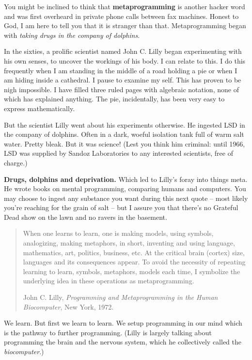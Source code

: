 \documentclass[10pt,twoside]{report}
\begin{document}
You might be inclined to think that {\bf metaprogramming} is another
hacker word and was first overheard in private phone calls between fax
machines.  Honest to God, I am here to tell you that it is stranger
than that. Metaprogramming began with {\em taking drugs in the company
  of dolphins}.

In the sixties, a prolific scientist named John C. Lilly began
experimenting with his own senses, to uncover the workings of his
body.  I can relate to this.  I do this frequently when I am standing
in the middle of a road holding a pie or when I am hiding inside a
cathedral.  I pause to examine my self.  This has proven to be nigh
impossible.  I have filled three ruled pages with algebraic notation,
none of which has explained anything.  The pie, incidentally, has been
very easy to express mathematically.

But the scientist Lilly went about his experiments otherwise.  He
ingested LSD in the company of dolphins. Often in a dark, woeful
isolation tank full of warm salt water.  Pretty bleak.  But it was
science!  (Lest you think him criminal: until 1966, LSD was supplied
by Sandoz Laboratories to any interested scientists, free of charge.)

{\bf Drugs, dolphins and deprivation.}  Which led to Lilly's foray
into things meta.  He wrote books on mental programming, comparing
humans and computers.  You may choose to ingest any substance you want
during this next quote -- most likely you're reaching for the grain of
salt -- but I assure you that there's no Grateful Dead show on the
lawn and no ravers in the basement.

\begin{quote}
When one learns to learn, one is making models, using symbols,
analogizing, making metaphors, in short, inventing and using language,
mathematics, art, politics, business, etc. At the critical brain
(cortex) size, languages and its consequences appear. To avoid the
necessity of repeating learning to learn, symbols, metaphors, models
each time, I symbolize the underlying idea in these operations as
metaprogramming.

John C. Lilly, {\em Programming and Metaprogramming in the Human
  Biocomputer}, New York, 1972.

\end{quote}


We learn.  But first we learn to learn.  We setup programming in our
mind which is the pathway to further programming.  (Lilly is largely
talking about programming the brain and the nervous system, which he
collectively called the {\em biocomputer}.)
\end{document}
